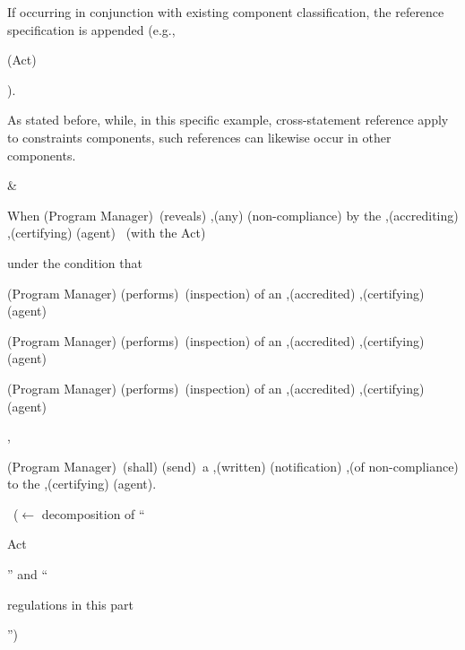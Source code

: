 \begin{landscape}
\begin{longtable}{\tabledims}
If occurring in conjunction with existing component classification, the reference specification is appended (e.g., \begin{exi}\Bdir{}(Act)\end{exi}).

As stated before, while, in this specific example, cross-statement reference apply to constraints components, such references can likewise occur in other components.

& 

\begin{exi}
\lb\lb \Cac{}\lb When \lsi \A{}(Program Manager)\rsi~\I{}(reveals) \Bdir{},\prop{}(any) \Bdir{}(non-compliance) \lsi by the  \Bind{},(accrediting) \Bind{},(certifying)  \Bind{}(agent)\rsi~\Cex{} (with the Act)\rb

\sp

\Cac{}\lb \lsi under the condition that\rsi

\sp

\lb \A{}(Program Manager) \lsi \I{}(performs)\rsi~\Bdir{}(inspection) of an \Bind{},(accredited) \Bind{},(certifying) \Bind{}(agent)\rb 

\sp

\OR

\sp

\lb \A{}(Program Manager) \lsi \I{}(performs)\rsi~\Bdir{}(inspection) of an \Bind{},(accredited) \Bind{},(certifying)  \Bind{}(agent)\rb 

\sp

\OR

\sp

\lb \A{}(Program Manager) \lsi \I{}(performs)\rsi~\Bdir{}(inspection) of an \Bind{},(accredited) \Bind{},(certifying) \Bind{}(agent)\rb 

\rb \rb, 

\A{}(\lsi Program Manager\rsi)~\D{}(shall) \I{}(\lsi send\rsi)~a \Bdir{},(written) \Bdir{}(notification) \Bdir{},(of non-compliance) to the \Bind{},(certifying) \Bind{}(agent).\rb

\end{exi}

\sp

\OR~($\leftarrow$ decomposition of ``\begin{emp}Act\end{emp}'' and ``\begin{emp}regulations in this part\end{emp}'')


\end{longtable}
\end{landscape}
